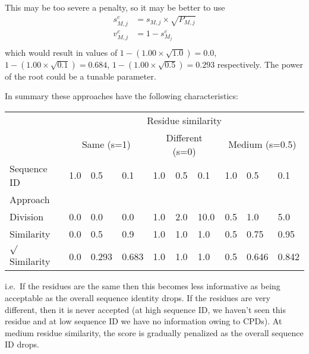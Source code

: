 \documentclass[a4paper]{article}
\begin{document}
This may be too severe a penalty, so it may be better to use
\begin{equation}
  \begin{array}{ll}
    s^c_{M,j} & = s_{M,j} \times \sqrt{P_{M, j}} \\
    v^c_{M,j} & = 1 - s^c_{M_j} \\
  \end{array}
\end{equation}
which would result in values of
$1-(1.00 \times \sqrt{1.0}) = 0.0$,
$1-(1.00 \times \sqrt{0.1}) = 0.684$,
$1-(1.00 \times \sqrt{0.5}) = 0.293$
respectively. The power of the root could be a tunable parameter.


In summary these approaches have the following characteristics:

\begin{center}
  \begin{tabular}{llllllllll} \hline
                         & \multicolumn{9}{c}{Residue similarity}                                                                    \\
                         & \multicolumn{3}{c|}{Same (s=1)} & \multicolumn{3}{c|}{Different (s=0)} & \multicolumn{3}{c}{Medium (s=0.5)} \\ \cline{2-10}    
    Sequence ID          & 1.0    & 0.5    & 0.1           & 1.0    & 0.5    & 0.1                & 1.0    & 0.5    & 0.1              \\ \hline        
    Approach             &        &        &               &        &        &                    &        &        &                  \\
    Division             & 0.0    & 0.0    & 0.0           & 1.0    & 2.0    & 10.0               & 0.5    & 1.0    & 5.0              \\       
    Similarity           & 0.0    & 0.5    & 0.9           & 1.0    & 1.0    & 1.0                & 0.5    & 0.75   & 0.95             \\       
    $\sqrt{}$Similarity  & 0.0    & 0.293  & 0.683         & 1.0    & 1.0    & 1.0                & 0.5    & 0.646  & 0.842            \\ \hline
  \end{tabular}
\end{center}

\noindent i.e.\ If the residues are the same then this becomes less
informative as being acceptable as the overall sequence identity
drops. If the residues are very different, then it is never accepted
(at high sequence ID, we haven't seen this residue and at low sequence
ID we have no information owing to CPDs). At medium residue similarity,
the score is gradually penalized as the overall sequence ID drops.
\end{document}
